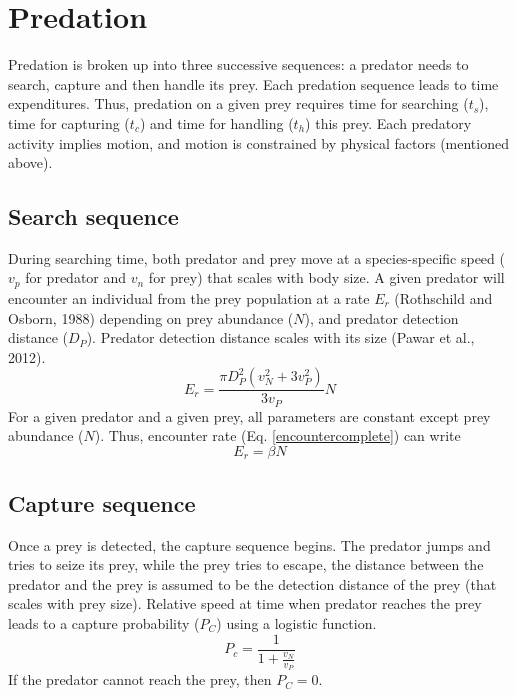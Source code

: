 \documentclass[utf8, 12 pt]{frontiers_suppmat}
\begin{document}
\section{Predation}
Predation is broken up into three successive sequences: a predator needs to search, capture and then handle its prey. Each predation sequence leads to time expenditures. Thus, predation on a given prey requires time for searching ($t_s$), time for capturing ($t_c$) and time for handling ($t_h$) this prey. Each predatory activity implies motion, and motion is constrained by physical factors (mentioned above). \par
\vspace{0.5 cm}
\subsection{Search sequence}
During searching time, both predator and prey move at a species-specific speed ($v_p$ for predator and $v_n$ for prey) that scales with body size. A given predator will encounter an individual from the prey population at a rate $E_r$ (Rothschild and Osborn, 1988)⁠ depending on prey abundance ($N$), and predator detection distance ($D_P$). Predator detection distance scales with its size (Pawar et al., 2012).
\begin{equation}\label{encountercomplete}
	E_r= \frac{\pi D_P^2 (v_N^2+3v_P^2)}{3v_P} N	
\end{equation}
For a given predator and a given prey, all parameters are constant except prey abundance ($N$). Thus, encounter rate (Eq. \ref{encountercomplete}) can write 
\begin{equation}\label{encounter}
	E_r= \beta N	
\end{equation}

\subsection{Capture sequence}
Once a prey is detected, the capture sequence begins. The predator jumps and tries to seize its prey, while the prey tries to escape, the distance between the predator and the prey is assumed to be the detection distance of the prey (that scales with prey size). Relative speed at time when predator reaches the prey leads to a capture probability ($P_C$) using a logistic function.
\begin{equation}
	P_c=\frac{1}{1+\frac{v_N}{v_P}}
\end{equation}
If the predator cannot reach the prey, then $P_C = 0$. 
\end{document}
